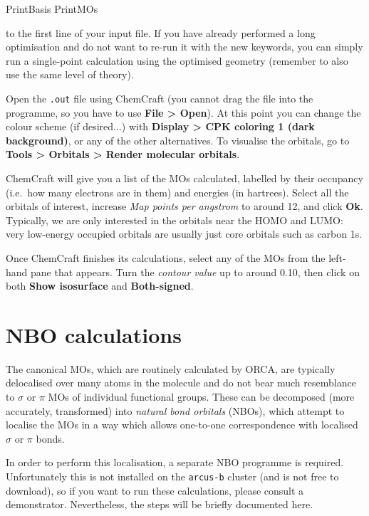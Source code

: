 \documentclass[10pt]{article}
\begin{document}
\begin{cmdline}
PrintBasis PrintMOs
\end{cmdline}

to the first line of your input file. If you have already performed a long optimisation and do not want to re-run it with the new keywords, you can simply run a single-point calculation using the optimised geometry (remember to also use the same level of theory).

Open the \texttt{.out} file using ChemCraft (you cannot drag the file into the programme, so you have to use \textbf{File > Open}). At this point you can change the colour scheme (if desired...) with \textbf{Display > CPK coloring 1 (dark background)}, or any of the other alternatives. To visualise the orbitals, go to \textbf{Tools > Orbitals > Render molecular orbitals}.

ChemCraft will give you a list of the MOs calculated, labelled by their occupancy (i.e.\ how many electrons are in them) and energies (in hartrees). Select all the orbitals of interest, increase \textit{Map points per angstrom} to around 12, and click \textbf{Ok}. Typically, we are only interested in the orbitals near the HOMO and LUMO: very low-energy occupied orbitals are usually just core orbitals such as carbon 1s.

Once ChemCraft finishes its calculations, select any of the MOs from the left-hand pane that appears. Turn the \textit{contour value} up to around 0.10, then click on both \textbf{Show isosurface} and \textbf{Both-signed}.


\section{NBO calculations}

The canonical MOs, which are routinely calculated by ORCA, are typically delocalised over many atoms in the molecule and do not bear much resemblance to $\sigma$ or $\pi$ MOs of individual functional groups. These can be decomposed (more accurately, transformed) into \textit{natural bond orbitals} (NBOs),\autocite{Weinhold2016} which attempt to localise the MOs in a way which allows one-to-one correspondence with localised $\sigma$ or $\pi$ bonds.

In order to perform this localisation, a separate NBO programme is required. Unfortunately this is not installed on the \texttt{arcus-b} cluster (and is not free to download), so if you want to run these calculations, please consult a demonstrator. Nevertheless, the steps will be briefly documented here.
\end{document}
